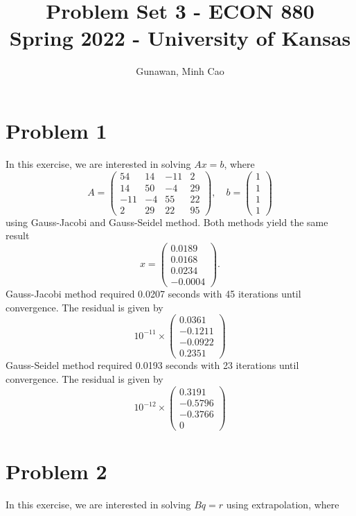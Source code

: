 \documentclass[11pt]{article}
\title{Problem Set 3 - ECON 880\\
	\small Spring 2022 - University of Kansas}
\author{Gunawan, Minh Cao}
\newcommand{\1}{\mathbbm{1}}
\begin{document}
\maketitle	

\section*{Problem 1}
In this exercise, we are interested in solving $Ax=b$, where
\[A = \begin{pmatrix}
	54 &14& -11& 2 \\ 14 &50& -4& 29 \\ -11 &-4 &55& 22 \\ 2& 29& 22& 95
\end{pmatrix}, \quad b = \begin{pmatrix}
	1\\1\\1\\1
\end{pmatrix} \]
using Gauss-Jacobi and Gauss-Seidel method. Both methods yield the same result
\[x = \begin{pmatrix}
	0.0189\\
	0.0168\\
	0.0234\\
	-0.0004
\end{pmatrix}.\]
Gauss-Jacobi method required 0.0207 seconds with 45 iterations until convergence. The residual is given by
\[
10^{-11} \times \begin{pmatrix}
	0.0361\\
	-0.1211\\
	-0.0922\\
	0.2351
\end{pmatrix}
\]
Gauss-Seidel method required 0.0193 seconds with 23 iterations until convergence. The residual is given by
\[10^{-12}\times \begin{pmatrix}
	0.3191\\
	-0.5796\\
	-0.3766\\
	0
\end{pmatrix}\]
   
\section*{Problem 2}
In this exercise, we are interested in solving $Bq=r$ using extrapolation, where
\end{document}
